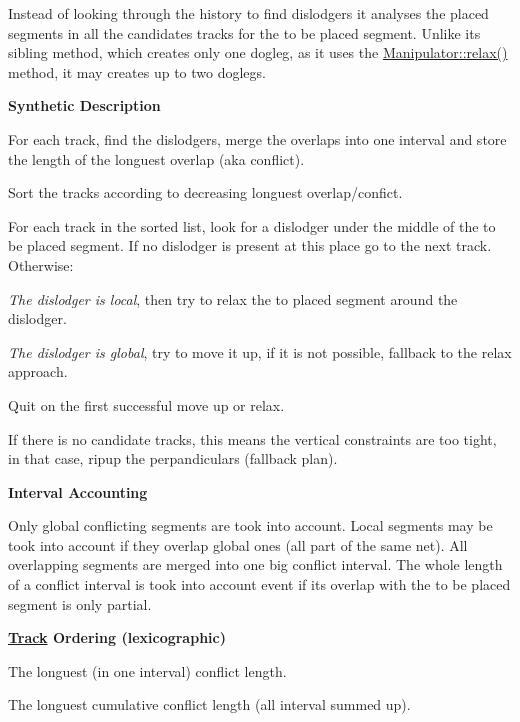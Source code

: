 Instead of looking through the history to find dislodgers it analyses the placed segments in all the candidates tracks for the to be placed segment. Unlike it\textquotesingle{}s sibling method, which creates only one dogleg, as it uses the \hyperlink{classKite_1_1Manipulator_a8b5b69fd5762d5a0cbc4ceea4d1b68c1}{Manipulator\+::relax()} method, it may creates up to two doglegs.

{\bfseries Synthetic Description}


\begin{DoxyEnumerate}
\item For each track, find the dislodgers, merge the overlaps into one interval and store the length of the longuest overlap (aka conflict).
\item Sort the tracks according to decreasing longuest overlap/confict.
\item For each track in the sorted list, look for a dislodger under the middle of the to be placed segment. If no dislodger is present at this place go to the next track. Otherwise\+:
\begin{DoxyItemize}
\item {\itshape The dislodger is local}, then try to relax the to placed segment around the dislodger.
\item {\itshape The dislodger is global}, try to move it up, if it is not possible, fallback to the relax approach.
\end{DoxyItemize}
\item Quit on the first successful move up or relax.
\item If there is no candidate tracks, this means the vertical constraints are too tight, in that case, ripup the perpandiculars (fallback plan).
\end{DoxyEnumerate}

{\bfseries Interval Accounting}

Only global conflicting segments are took into account. Local segments may be took into account if they overlap global ones (all part of the same net). All overlapping segments are merged into one big conflict interval. The whole length of a conflict interval is took into account event if it\textquotesingle{}s overlap with the to be placed segment is only partial.

{\bfseries \hyperlink{classKite_1_1Track}{Track} Ordering (lexicographic)}


\begin{DoxyEnumerate}
\item The longuest (in one interval) conflict length.
\item The longuest cumulative conflict length (all interval summed up).
\end{DoxyEnumerate}

